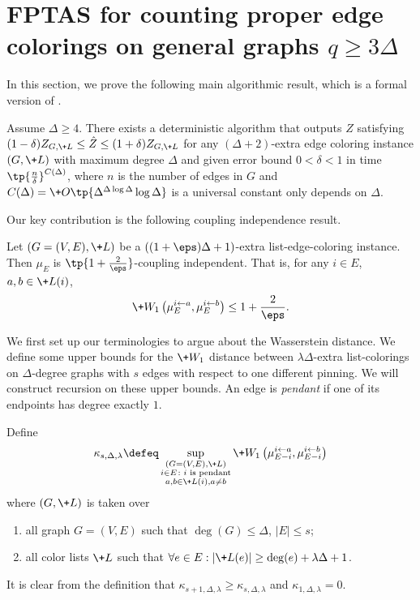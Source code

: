 \documentclass[a4paper,11pt]{article}
\newcommand{\pin}{\leftarrow}
\newcommand{\W}[1]{\+W_1\left(#1\right)}
\begin{document}
\newcommand{\zzz}{1+\sum_k(\gamma_k\vee\delta_k)}



\section{FPTAS for counting proper edge colorings on general graphs $q\ge 3\Delta$}\label{sec:FPTAS}


In this section, we prove the following main algorithmic result, which is a formal version of .
\begin{theorem}\label{thm:FPTAS}
    Assume $\Delta\geq 4$. There exists a deterministic algorithm that outputs $\hat{Z}$ satisfying $(1-\delta)Z_{G,\+L}\leq \hat{Z}\leq (1+\delta)Z_{G,\+L}$ for any $(\Delta + 2)$-extra edge coloring instance $(G,\+L)$ with maximum degree $\Delta$ and given error bound $0<\delta <1$ in time $\tp{\frac{n}{\delta}}^{C(\Delta)}$,  where $n$ is the number of edges in $G$ and $C(\Delta)=\+O\tp{\Delta^{\Delta\log \Delta}\log \Delta}$
    is a universal constant only depends on $\Delta$.
\end{theorem}

Our key contribution is the following coupling independence result.

\begin{theorem}\label{thm:coupling-independence}
    Let $(G=(V, E), \+L)$ be a $((1+\eps)\Delta+1)$-extra list-edge-coloring instance.  Then $\mu_E$ is $\tp{1+\frac{2}{\eps}}$-coupling independent. That is, for any $i\in E$, $a, b\in \+L(i)$,
    \[
    \W{\mu_E^{i\pin a}, \mu_E^{i\pin b}} \le 1 + \frac{2}{\eps}.
    \]
\end{theorem}

We first set up our terminologies to argue about the Wasserstein distance. We define some upper bounds for the $\+W_1$ distance between $\lambda\Delta$-extra list-colorings on $\Delta$-degree graphs with $s$ edges with respect to one different pinning. We will construct recursion on these upper bounds.
An edge is \emph{pendant} if one of its endpoints has degree exactly $1$.
\begin{definition}\label{def:kappa}
Define
\[
\kappa_{s, \Delta, \lambda} \defeq 
\sup_{\substack{(G=(V, E), \+L)\\ i\in E\colon i \text{ is pendant} \\ a, b\in \+L(i), a\neq b}}
\W{
\mu_{E-i}^{i\pin a}, \mu_{E-i}^{i\pin b}
}
\]
where $(G, \+L)$ is taken over
\begin{enumerate}
    \item all graph $G=(V, E)$ such that $\deg(G)\le \Delta$, $|E|\le s$;
    \item all color lists $\+L$ such that $\forall e\in E: |\+L(e)|\ge \deg(e) + \lambda \Delta + 1$.
\end{enumerate}
\end{definition}
\begin{remark}
    It is clear from the definition that $\kappa_{s+1, \Delta, \lambda}\ge \kappa_{s, \Delta, \lambda}$
    and $\kappa_{1, \Delta, \lambda}=0$.
\end{remark}
\end{document}
